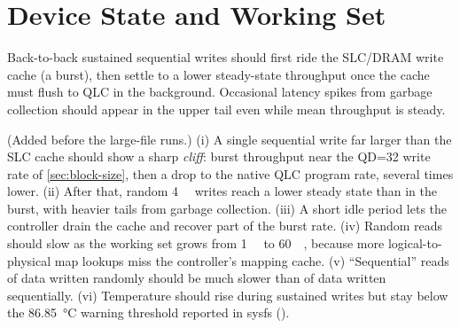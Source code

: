 \section{Device State and Working Set}\label{sec:device-state}

\begin{hypothesis}
  Back-to-back sustained sequential writes should first ride the SLC/DRAM write cache (a burst), then
  settle to a lower steady-state throughput once the cache must flush to QLC in the background. Occasional
  latency spikes from garbage collection should appear in the upper tail even while mean throughput is
  steady.
\end{hypothesis}

\begin{hypothesis}
  (Added before the large-file runs.) (i) A single sequential write far larger than the SLC cache should
  show a sharp \emph{cliff}: burst throughput near the QD=32 write rate of \cref{sec:block-size}, then a
  drop to the native QLC program rate, several times lower. (ii) After that, random \qty{4}{\kibi\byte}
  writes reach a lower steady state than in the burst, with heavier tails from garbage collection.
  (iii) A short idle period lets the controller drain the cache and recover part of the burst rate.
  (iv) Random reads should slow as the working set grows from \qty{1}{\gibi\byte} to
  \qty{60}{\gibi\byte}, because more logical-to-physical map lookups miss the controller's mapping cache.
  (v) \enquote{Sequential} reads of data written randomly should be much slower than of data written
  sequentially. (vi) Temperature should rise during sustained writes but stay below the
  \qty{86.85}{\celsius} warning threshold reported in sysfs ().
\end{hypothesis}

